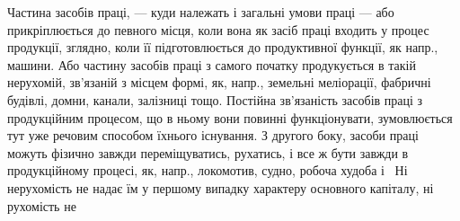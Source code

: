 Частина засобів праці, — куди належать і загальні умови праці — або
прикріплюється до певного місця, коли вона як засіб праці входить у процес
продукції, зглядно, коли її підготовлюється до продуктивної функції, як
напр., машини. Або частину засобів праці з самого початку продукується
в такій нерухомій, зв’язаній з місцем формі, як, напр., земельні
меліорації, фабричні будівлі, домни, канали, залізниці тощо. Постійна
зв’язаність засобів праці з продукційним процесом, що в ньому вони
повинні функціонувати, зумовлюється тут уже речовим способом їхнього
існування. З другого боку, засоби праці можуть фізично завжди переміщуватись,
рухатись, і все ж бути завжди в продукційному процесі, як,
напр., локомотив, судно, робоча худоба і~ Ні нерухомість не надає
їм у першому випадку характеру основного капіталу, ні рухомість не
\parbreak{}  %

